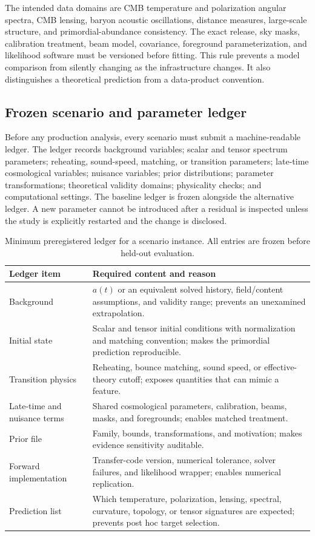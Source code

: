\documentclass[10pt,conference]{IEEEtran}
\begin{document}
The intended data domains are CMB temperature and polarization angular spectra, CMB lensing, baryon acoustic oscillations, distance measures, large-scale structure, and primordial-abundance consistency. The exact release, sky masks, calibration treatment, beam model, covariance, foreground parameterization, and likelihood software must be versioned before fitting. This rule prevents a model comparison from silently changing as the infrastructure changes. It also distinguishes a theoretical prediction from a data-product convention.

\subsection{Frozen scenario and parameter ledger}

Before any production analysis, every scenario must submit a machine-readable ledger. The ledger records background variables; scalar and tensor spectrum parameters; reheating, sound-speed, matching, or transition parameters; late-time cosmological variables; nuisance variables; prior distributions; parameter transformations; theoretical validity domains; physicality checks; and computational settings. The baseline ledger is frozen alongside the alternative ledger. A new parameter cannot be introduced after a residual is inspected unless the study is explicitly restarted and the change is disclosed.

\begin{table}[!t]
\caption{Minimum preregistered ledger for a scenario instance. All entries are frozen before held-out evaluation.}
\label{tab:parameter-ledger}
\centering
\footnotesize
\setlength{\tabcolsep}{3pt}
\begin{tabular}{p{}p{}}
\toprule
Ledger item & Required content and reason \\
\midrule
Background & $a(t)$ or an equivalent solved history, field/content assumptions, and validity range; prevents an unexamined extrapolation. \\
Initial state & Scalar and tensor initial conditions with normalization and matching convention; makes the primordial prediction reproducible. \\
Transition physics & Reheating, bounce matching, sound speed, or effective-theory cutoff; exposes quantities that can mimic a feature. \\
Late-time and nuisance terms & Shared cosmological parameters, calibration, beams, masks, and foregrounds; enables matched treatment. \\
Prior file & Family, bounds, transformations, and motivation; makes evidence sensitivity auditable. \\
Forward implementation & Transfer-code version, numerical tolerance, solver failures, and likelihood wrapper; enables numerical replication. \\
Prediction list & Which temperature, polarization, lensing, spectral, curvature, topology, or tensor signatures are expected; prevents post hoc target selection. \\
\bottomrule
\end{tabular}
\end{table}
\end{document}
